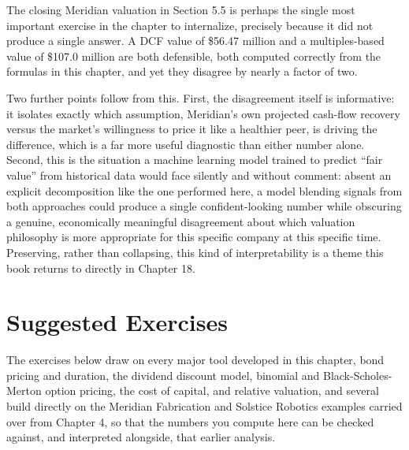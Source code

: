 \documentclass[../ai_in_finance]{subfiles}
\begin{document}
The closing Meridian valuation in Section 5.5 is perhaps the single most important exercise in the chapter to internalize, precisely because it did not produce a single answer. A DCF value of \$56.47 million and a multiples-based value of \$107.0 million are both defensible, both computed correctly from the formulas in this chapter, and yet they disagree by nearly a factor of two.

Two further points follow from this. First, the disagreement itself is informative: it isolates exactly which assumption, Meridian's own projected cash-flow recovery versus the market's willingness to price it like a healthier peer, is driving the difference, which is a far more useful diagnostic than either number alone.
Second, this is the situation a machine learning model trained to predict ``fair value'' from historical data would face silently and without comment: absent an explicit decomposition like the one performed here, a model blending signals from both approaches could produce a single confident-looking number while obscuring a genuine, economically meaningful disagreement about which valuation philosophy is more appropriate for this specific company at this specific time. Preserving, rather than collapsing, this kind of interpretability is a theme this book returns to directly in Chapter 18.

\section{Suggested Exercises}

The exercises below draw on every major tool developed in this chapter, bond pricing and duration, the dividend discount model, binomial and Black-Scholes-Merton option pricing, the cost of capital, and relative valuation, and several build directly on the Meridian Fabrication and Solstice Robotics examples carried over from Chapter 4, so that the numbers you compute here can be checked against, and interpreted alongside, that earlier analysis.
\end{document}
